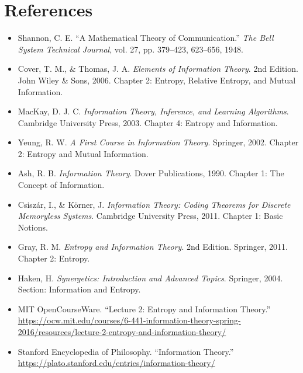\documentclass[12pt,a4paper]{article}
\begin{document}
\section{References}
\begin{itemize}
    \item Shannon, C. E. ``A Mathematical Theory of Communication.'' \textit{The Bell System Technical Journal}, vol. 27, pp. 379–423, 623–656, 1948.
    \item Cover, T. M., \& Thomas, J. A. \textit{Elements of Information Theory}. 2nd Edition. John Wiley \& Sons, 2006. Chapter 2: Entropy, Relative Entropy, and Mutual Information.
    \item MacKay, D. J. C. \textit{Information Theory, Inference, and Learning Algorithms}. Cambridge University Press, 2003. Chapter 4: Entropy and Information.
    \item Yeung, R. W. \textit{A First Course in Information Theory}. Springer, 2002. Chapter 2: Entropy and Mutual Information.
    \item Ash, R. B. \textit{Information Theory}. Dover Publications, 1990. Chapter 1: The Concept of Information.
    \item Csiszár, I., \& Körner, J. \textit{Information Theory: Coding Theorems for Discrete Memoryless Systems}. Cambridge University Press, 2011. Chapter 1: Basic Notions.
    \item Gray, R. M. \textit{Entropy and Information Theory}. 2nd Edition. Springer, 2011. Chapter 2: Entropy.
    \item Haken, H. \textit{Synergetics: Introduction and Advanced Topics}. Springer, 2004. Section: Information and Entropy.
    \item MIT OpenCourseWare. ``Lecture 2: Entropy and Information Theory.'' \url{https://ocw.mit.edu/courses/6-441-information-theory-spring-2016/resources/lecture-2-entropy-and-information-theory/}
    \item Stanford Encyclopedia of Philosophy. ``Information Theory.'' \url{https://plato.stanford.edu/entries/information-theory/}
\end{itemize}
\end{document}

